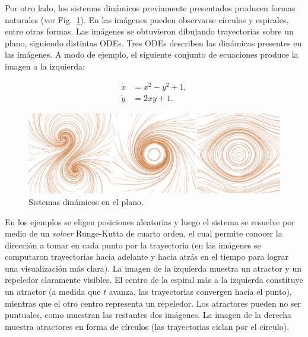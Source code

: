 
Por otro lado, los sistemas din\'amicos previamente presentados producen formas naturales (ver Fig.~\ref{fg:sistdin2}).
En las im\'agenes pueden observarse c\'irculos y espirales, entre otras formas.
Las im\'agenes se obtuvieron dibujando trayectorias sobre un plano, siguiendo distintas ODEs.
Tres ODEs describen las din\'amicas presentes en las im\'agenes.
A modo de ejemplo, el siguiente conjunto de ecuaciones produce la imagen a la izquierda:

\begin{equation} \label{eq:simple}  
  \begin{aligned}
    \dot{x} &= x^{2}-y^{2}+1,\\
    \dot{y} &= 2xy+1.
  \end{aligned}
\end{equation}


\begin{figure}[htb!]
  \centerline{\includegraphics[width=13cm]{figures/Fig2}}
  \caption{Sistemas dinámicos en el plano.}
  \label{fg:sistdin2}
\end{figure}

En los ejemplos se eligen posiciones aleatorias y luego el sistema se resuelve por medio de un {\em solver} Runge-Kutta de cuarto orden, el cual permite conocer la direcci\'on a tomar en cada punto por la trayectoria (en las im\'agenes se computaron trayectorias hacia adelante y hacia atrás en el tiempo para lograr una visualizaci\'on más clara).
La imagen de la izquierda muestra un atractor y un repeledor claramente visibles.
El centro de la espiral m\'as a la izquierda constituye un atractor (a medida que $t$ avanza, las trayectorias convergen hacia el punto), mientras que el otro centro representa un repeledor.
Los atractores pueden no ser puntuales, como muestran las restantes dos im\'agenes.
La imagen de la derecha muestra atractores en forma de c\'irculos (las trayectorias ciclan por el c\'irculo).

